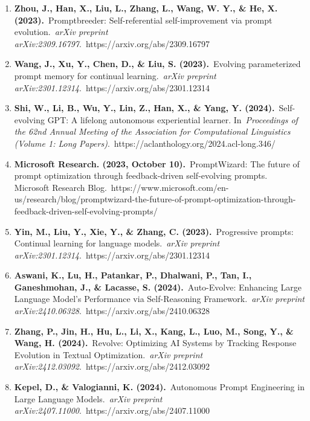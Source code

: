 \documentclass[10pt,a4paper,twocolumn]{article}
\begin{document}
\begin{enumerate}
    \item 
\textbf{Zhou, J., Han, X., Liu, L., Zhang, L., Wang, W. Y., \& He, X. (2023).} Promptbreeder: Self-referential self-improvement via prompt evolution. \textit{arXiv preprint arXiv:2309.16797}. https://arxiv.org/abs/2309.16797

  \item 
\textbf{Wang, J., Xu, Y., Chen, D., \& Liu, S. (2023).} Evolving parameterized prompt memory for continual learning. \textit{arXiv preprint arXiv:2301.12314}. https://arxiv.org/abs/2301.12314

   \item 
\textbf{Shi, W., Li, B., Wu, Y., Lin, Z., Han, X., \& Yang, Y. (2024).} Self-evolving GPT: A lifelong autonomous experiential learner. In \textit{Proceedings of the 62nd Annual Meeting of the Association for Computational Linguistics (Volume 1: Long Papers)}. https://aclanthology.org/2024.acl-long.346/

  \item 
\textbf{Microsoft Research. (2023, October 10).} PromptWizard: The future of prompt optimization through feedback-driven self-evolving prompts. Microsoft Research Blog. https://www.microsoft.com/en-us/research/blog/promptwizard-the-future-of-prompt-optimization-through-feedback-driven-self-evolving-prompts/

   \item 
\textbf{Yin, M., Liu, Y., Xie, Y., \& Zhang, C. (2023).} Progressive prompts: Continual learning for language models. \textit{arXiv preprint arXiv:2301.12314}. https://arxiv.org/abs/2301.12314

  \item 
\textbf{Aswani, K., Lu, H., Patankar, P., Dhalwani, P., Tan, I., Ganeshmohan, J., \& Lacasse, S. (2024).} Auto-Evolve: Enhancing Large Language Model's Performance via Self-Reasoning Framework. \textit{arXiv preprint arXiv:2410.06328}. https://arxiv.org/abs/2410.06328

   \item 
\textbf{Zhang, P., Jin, H., Hu, L., Li, X., Kang, L., Luo, M., Song, Y., \& Wang, H. (2024).} Revolve: Optimizing AI Systems by Tracking Response Evolution in Textual Optimization. \textit{arXiv preprint arXiv:2412.03092}. https://arxiv.org/abs/2412.03092

  \item 
\textbf{Kepel, D., \& Valogianni, K. (2024).} Autonomous Prompt Engineering in Large Language Models. \textit{arXiv preprint arXiv:2407.11000}. https://arxiv.org/abs/2407.11000


\end{enumerate}
\end{document}
